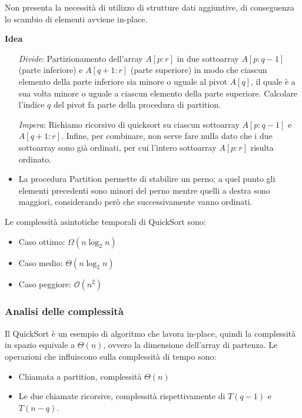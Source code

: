 \documentclass[a4paper, 11pt]{article}
\begin{document}
Non presenta la necessità di utilizzo di strutture dati aggiuntive, di conseguenza lo scambio di elementi avviene in-place.

\noindent\textbf{Idea}

\begin{itemize}
  \item[\textit{Divide}:] Partizionamento dell'array $A[p:r]$ in due sottoarray $A[p:q-1]$ (parte inferiore) e $A[q+1:r]$ (parte superiore) in modo che ciascun elemento della parte inferiore sia minore o uguale al pivot $A[q]$, il quale è a sua volta minore o uguale a ciascun elemento della parte superiore. Calcolare l'indice $q$ del pivot fa parte della procedura di partition.
  
  \item[\textit{Impera}:] Richiamo ricorsivo di quicksort su ciascun sottoarray $A[p:q-1]$ e $A[q+1:r]$. Infine, per combinare, non serve fare nulla dato che i due sottoarray sono già ordinati, per cui l'intero sottoarray $A[p:r]$ risulta ordinato.
  
  \item La procedura Partition permette di stabilire un perno; a quel punto gli elementi precedenti sono minori del perno mentre quelli a destra sono maggiori, considerando però che successivamente vanno ordinati.
\end{itemize}

\noindent Le complessità asintotiche temporali di QuickSort sono: 
\begin{itemize}
    \item Caso ottimo: $\Omega(n\log_2n)$
    \item Caso medio: $\Theta(n\log_2n)$
    \item Caso peggiore: $\mathcal{O}(n^2)$
\end{itemize}

\subsubsection{Analisi delle complessità}
Il QuickSort è un esempio di algoritmo che lavora in-place, quindi la complessità in spazio equivale a $\Theta(n)$, ovvero la dimensione dell'array di partenza.\bigbreak
\noindent Le operazioni che influiscono sulla complessità di tempo sono:
\begin{itemize}
    \item Chiamata a partition, complessità $\Theta(n)$
    \item Le due chiamate ricorsive, complessità rispettivamente di $T(q-1)$ e $T(n-q)$.
\end{itemize}
\end{document}
